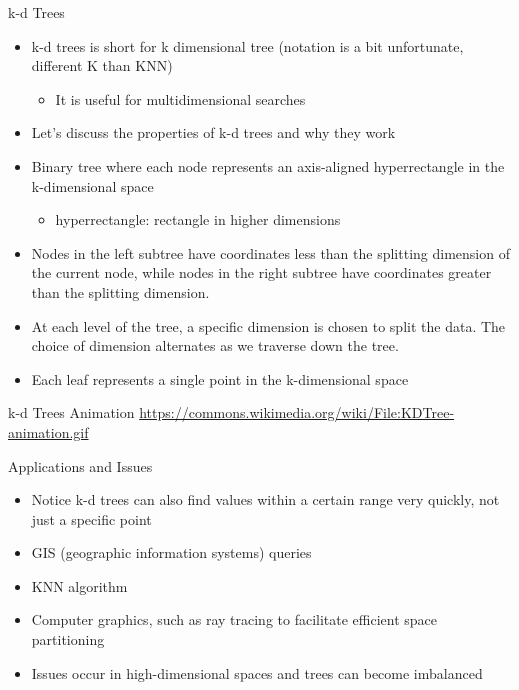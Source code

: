 \documentclass[
  ignorenonframetext,
]{beamer}
\providecommand{\tightlist}{%
  \setlength{\itemsep}{0pt}\setlength{\parskip}{0pt}}\usepackage{longtable,booktabs,array}
\begin{document}
\begin{frame}{k-d Trees}
\protect\hypertarget{k-d-trees}{}
\begin{itemize}
\item
  k-d trees is short for k dimensional tree (notation is a bit
  unfortunate, different K than KNN)

  \begin{itemize}
  \tightlist
  \item
    It is useful for multidimensional searches
  \end{itemize}
\item
  Let's discuss the properties of k-d trees and why they work
\item
  Binary tree where each node represents an axis-aligned hyperrectangle
  in the k-dimensional space

  \begin{itemize}
  \tightlist
  \item
    hyperrectangle: rectangle in higher dimensions
  \end{itemize}
\item
  Nodes in the left subtree have coordinates less than the splitting
  dimension of the current node, while nodes in the right subtree have
  coordinates greater than the splitting dimension.
\item
  At each level of the tree, a specific dimension is chosen to split the
  data. The choice of dimension alternates as we traverse down the tree.
\item
  Each leaf represents a single point in the k-dimensional space
\end{itemize}
\end{frame}

\begin{frame}{k-d Trees Animation}
\protect\hypertarget{k-d-trees-animation}{}
\url{https://commons.wikimedia.org/wiki/File:KDTree-animation.gif}
\end{frame}

\begin{frame}{Applications and Issues}
\protect\hypertarget{applications-and-issues}{}
\begin{itemize}
\item
  Notice k-d trees can also find values within a certain range very
  quickly, not just a specific point
\item
  GIS (geographic information systems) queries
\item
  KNN algorithm
\item
  Computer graphics, such as ray tracing to facilitate efficient space
  partitioning
\item
  Issues occur in high-dimensional spaces and trees can become
  imbalanced
\end{itemize}
\end{frame}
\end{document}
